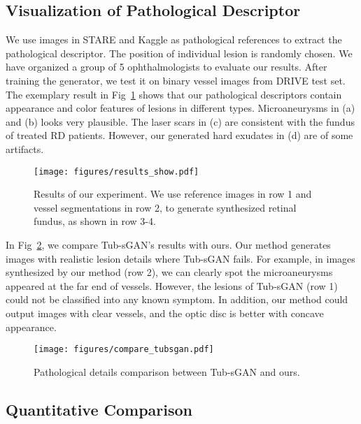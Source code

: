 \documentclass[letterpaper]{article} %
\begin{document}
    \subsection{Visualization of Pathological Descriptor}

    We use images in STARE and Kaggle as pathological references to extract the pathological descriptor. The position of individual lesion is randomly chosen.  We have organized a group of 5 ophthalmologists to evaluate our results.
    After training the generator, we test it on binary vessel images from DRIVE test set. The exemplary result in Fig~\ref{fig:results_show} shows that our pathological descriptors contain appearance and color features of lesions in different types. Microaneurysms in (a) and (b) looks very plausible.  The laser scars in (c) are consistent with the fundus of treated RD patients. However, our generated hard exudates in (d) are of some artifacts.

	\begin{figure}[t]
		\begin{center}
			\texttt{[image: figures/results\_show.pdf]}
		\end{center}
		\caption{Results of our experiment. We use reference images in row 1 and vessel segmentations in row 2, to generate synthesized retinal fundus, as shown in row 3-4.}
		\label{fig:results_show}
	\end{figure}

    In Fig~\ref{fig:compare_tubsgan}, we compare Tub-sGAN's results with ours. Our method generates images with realistic lesion details where Tub-sGAN fails. For example, in images synthesized by our method (row 2), we can clearly spot the microaneurysms appeared at the far end of vessels. However, the lesions of Tub-sGAN (row 1) could not be classified into any known symptom. In addition, our method could output images with clear vessels, and the optic disc is better with concave appearance.

	\begin{figure}[t]
		\begin{center}
			\texttt{[image: figures/compare\_tubsgan.pdf]}
		\end{center}
		\caption{Pathological details comparison between Tub-sGAN and ours. }
		\label{fig:compare_tubsgan}
	\end{figure}

	\subsection{Quantitative Comparison}
\end{document}
